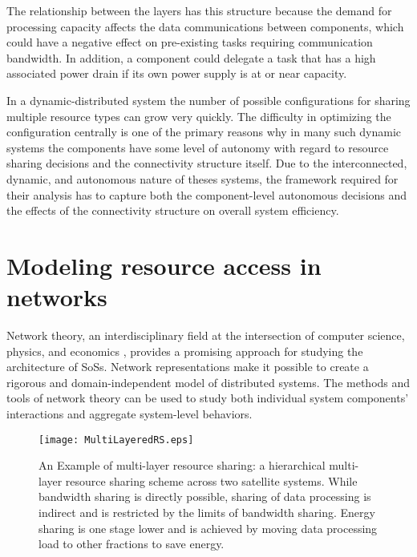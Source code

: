 \documentclass[journal,onecolumn]{IEEEtran}
\theoremstyle{plain}
\begin{document}
The relationship between the layers has this structure because the demand for processing capacity affects the data communications between components, which could have a negative effect on pre-existing tasks requiring communication bandwidth. In addition, a component could delegate a task that has a high associated power drain if its own power supply is at or near capacity.

In a dynamic-distributed system the number of possible configurations for sharing multiple resource types can grow very quickly. The difficulty in optimizing the configuration centrally is one of the primary reasons why in many such dynamic systems the components have some level of autonomy with regard to resource sharing decisions and the connectivity structure itself. Due to the interconnected, dynamic, and autonomous nature of theses systems, the framework required for their analysis has to capture both the component-level autonomous decisions and the effects of the connectivity structure on overall system efficiency.



\section{Modeling resource access in networks}
\label{Modelling_access}
Network theory, an interdisciplinary field at the intersection of computer science, physics, and economics \citep{jackson2008social,easley2010networks,newman2010networks}, provides a promising approach for studying the architecture of SoSs. Network representations make it possible to create a rigorous and domain-independent model of distributed systems. The methods and tools of network theory can be used to study both individual system components' interactions and  aggregate system-level behaviors. 


\begin{figure}[!t]
\centering
\texttt{[image: MultiLayeredRS.eps]}
\caption{An Example of multi-layer resource sharing: a hierarchical multi-layer resource sharing scheme across two satellite systems. While bandwidth sharing is directly possible, sharing of data processing is indirect and is restricted by the limits of bandwidth sharing. Energy sharing is one stage lower and is achieved by moving data processing load to other fractions to save energy. }
\label{MultiLayeredRS}
\end{figure}
\end{document}
